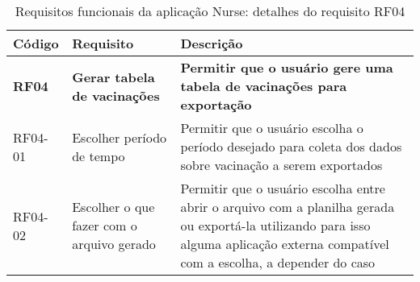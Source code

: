 \begin{table}[ht!]
  \centering
  {
  \begin{tabularx}{\textwidth}{
    | >{\centering\arraybackslash}m{} 
    | >{\centering\arraybackslash}m{} 
    | >{\raggedright\arraybackslash}X | }
    \hline
    \rowcolor{green!100}
    \textbf{Código} & \textbf{Requisito} & \textbf{Descrição} \\ \hline \hline
    \textbf{RF04}  &  \textbf{Gerar tabela de vacinações} & \textbf{Permitir que o usuário gere uma
    tabela de vacinações para
    exportação}  \\ \hline \hline
    RF04-01 & Escolher período de tempo               & Permitir que o usuário escolha o período desejado para coleta dos dados sobre vacinação a serem exportados \\ \hline
    RF04-02 & Escolher o que fazer com o arquivo gerado                     & Permitir que o usuário escolha entre abrir o arquivo com a planilha gerada ou exportá-la utilizando para isso alguma aplicação externa compatível com a escolha, a depender do caso \\ \hline
  \end{tabularx}}
\caption{Requisitos funcionais da aplicação Nurse: detalhes do requisito RF04}
\label{tab:rf04_detalhe}
\end{table}